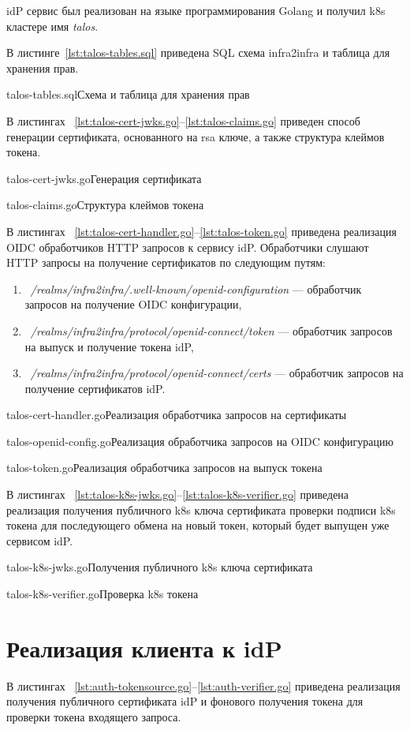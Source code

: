 idP сервис был реализован на языке программирования Golang и получил k8s кластере имя \textit{talos}.

В листинге~\ref{lst:talos-tables.sql} приведена SQL схема infra2infra и таблица для хранения прав.

	{talos-tables.sql}{Схема и таблица для хранения прав}

В листингах ~\ref{lst:talos-cert-jwks.go}--\ref{lst:talos-claims.go} приведен способ генерации сертификата, основанного на rsa ключе, а также структура клеймов токена.

	{talos-cert-jwks.go}{Генерация сертификата}

	{talos-claims.go}{Структура клеймов токена}

В листингах ~\ref{lst:talos-cert-handler.go}--\ref{lst:talos-token.go} приведена реализация OIDC обработчиков HTTP запросов к сервису idP.
Обработчики слушают HTTP запросы на получение сертификатов по следующим путям:
\begin{enumerate}
\item ~\textit{/realms/infra2infra/.well-known/openid-configuration} --- обработчик запросов на получение OIDC конфигурации,
\item ~\textit{/realms/infra2infra/protocol/openid-connect/token} --- обработчик запросов на выпуск и получение токена idP,
\item ~\textit{/realms/infra2infra/protocol/openid-connect/certs} --- обработчик запросов на получение сертификатов idP.
\end{enumerate}

	{talos-cert-handler.go}{Реализация обработчика запросов на сертификаты}
	
	{talos-openid-config.go}{Реализация обработчика запросов на OIDC конфигурацию}	

	{talos-token.go}{Реализация обработчика запросов на выпуск токена}

В листингах ~\ref{lst:talos-k8s-jwks.go}--\ref{lst:talos-k8s-verifier.go} приведена реализация получения публичного k8s ключа сертификата проверки подписи k8s токена для последующего обмена на новый токен, который будет выпущен уже сервисом idP.

	{talos-k8s-jwks.go}{Получения публичного k8s ключа сертификата}

	{talos-k8s-verifier.go}{Проверка k8s токена}


\section{Реализация клиента к idP}
В листингах ~\ref{lst:auth-tokensource.go}--\ref{lst:auth-verifier.go} приведена реализация получения публичного сертификата idP и фонового получения токена для проверки токена входящего запроса.

